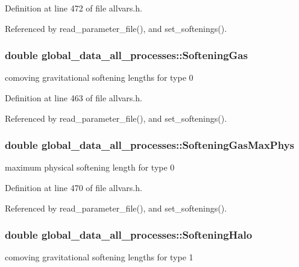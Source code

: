Definition at line 472 of file allvars.h.



Referenced by read\_\-parameter\_\-file(), and set\_\-softenings().

\hypertarget{structglobal__data__all__processes_a1f85943960c69ff351b48fc2f3933ec2}{
\subsubsection[{SofteningGas}]{\setlength{\rightskip}{0pt plus 5cm}double {\bf global\_\-data\_\-all\_\-processes::SofteningGas}}}
\label{structglobal__data__all__processes_a1f85943960c69ff351b48fc2f3933ec2}
comoving gravitational softening lengths for type 0 

Definition at line 463 of file allvars.h.



Referenced by read\_\-parameter\_\-file(), and set\_\-softenings().

\hypertarget{structglobal__data__all__processes_a1e7634a0c6aa4affa124e095bf32285b}{
\subsubsection[{SofteningGasMaxPhys}]{\setlength{\rightskip}{0pt plus 5cm}double {\bf global\_\-data\_\-all\_\-processes::SofteningGasMaxPhys}}}
\label{structglobal__data__all__processes_a1e7634a0c6aa4affa124e095bf32285b}
maximum physical softening length for type 0 

Definition at line 470 of file allvars.h.



Referenced by read\_\-parameter\_\-file(), and set\_\-softenings().

\hypertarget{structglobal__data__all__processes_a892cb7014ecd4b3910c493755b875b7e}{
\subsubsection[{SofteningHalo}]{\setlength{\rightskip}{0pt plus 5cm}double {\bf global\_\-data\_\-all\_\-processes::SofteningHalo}}}
\label{structglobal__data__all__processes_a892cb7014ecd4b3910c493755b875b7e}
comoving gravitational softening lengths for type 1 

